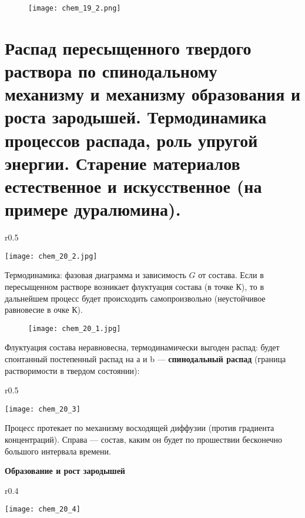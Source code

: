 \begin{figure}[h!]
    \centering
    \texttt{[image: chem\_19\_2.png]}
\end{figure}


\section{Распад пересыщенного твердого раствора по спинодальному механизму и механизму образования и роста зародышей. Термодинамика процессов распада, роль упругой энергии. Старение материалов естественное и искусственное (на примере дуралюмина).}


\begin{wrapfigure}{r}{0.5\textwidth}
    \begin{center}
        \texttt{[image: chem\_20\_2.jpg]}
    \end{center}
\end{wrapfigure}

Термодинамика: фазовая диаграмма и зависимость $G$ от состава. Если в пересыщенном растворе возникает флуктуация состава (в точке К), то в дальнейшем процесс будет происходить самопроизвольно (неустойчивое равновесие в очке К).

\begin{figure}[h!]
    \centering
    \texttt{[image: chem\_20\_1.jpg]}
\end{figure}


Флуктуация состава неравновесна, термодинамически выгоден распад: будет спонтанный постепенный распад на а и b --- \textbf{спинодальный распад} (граница растворимости в твердом состоянии):





\begin{wrapfigure}{r}{0.5\textwidth}
    \begin{center}
        \texttt{[image: chem\_20\_3]}
    \end{center}
\end{wrapfigure}

Процесс протекает по механизму восходящей диффузии (против градиента концентраций). Справа --- состав, каким он будет по прошествии бесконечно большого интервала времени.

\textbf{Образование и рост зародышей }

\begin{wrapfigure}{r}{0.4\textwidth}
    \begin{center}
        \texttt{[image: chem\_20\_4]}
    \end{center}
\end{wrapfigure}

